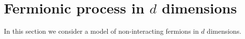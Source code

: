 \documentclass[%
 jmp,
cp,  %
 amsmath,amsthm,amssymb,%
 reprint,%
onecolumn]{revtex4-2}
\begin{document}







\section{Fermionic process in $d$ dimensions} \label{sec:fermions}

In this section we consider a model of non-interacting fermions in $d$ dimensions. 
\end{document}
